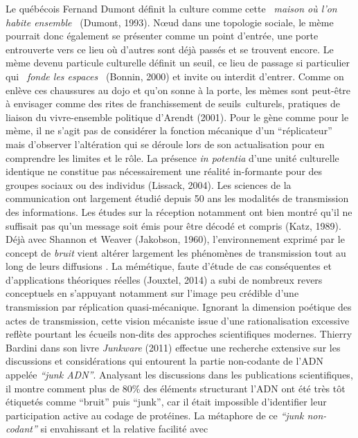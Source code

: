 Le qu\'eb\'ecois Fernand Dumont d\'efinit la culture comme cette \textit{{\guillemotleft}~maison o\`u l{\textquoteright}on habite ensemble~{\guillemotright} }(Dumont, 1993). N{\oe}ud dans une topologie sociale, le m\`eme pourrait donc \'egalement se pr\'esenter comme un point d{\textquoteright}entr\'ee, une porte entrouverte vers ce lieu o\`u d{\textquoteright}autres sont d\'ej\`a pass\'es et se trouvent encore. Le m\`eme devenu particule culturelle d\'efinit un seuil, ce lieu de passage si particulier qui \textit{{\guillemotleft}~fonde les espaces~{\guillemotright}} (Bonnin, 2000) et invite ou interdit d{\textquoteright}entrer. Comme on enl\`eve ces chaussures au dojo et qu{\textquoteright}on sonne \`a la porte, les m\`emes sont peut-\^etre \`a envisager comme des rites de franchissement de seuils~culturels, pratiques de liaison du vivre-ensemble politique d{\textquoteright}Arendt (2001). Pour le g\`ene comme pour le m\`eme, il ne s{\textquoteright}agit pas de consid\'erer la fonction m\'ecanique d{\textquoteright}un {\textquotedblleft}r\'eplicateur{\textquotedblright} mais d{\textquoteright}observer l{\textquoteright}alt\'eration qui se d\'eroule lors de son actualisation pour en comprendre les limites et le r\^ole. La pr\'esence \textit{in potentia }d{\textquoteright}une unit\'e culturelle identique ne constitue pas n\'ecessairement une r\'ealit\'e in-formante pour des groupes sociaux ou des individus (Lissack, 2004). Les sciences de la communication ont largement \'etudi\'e depuis 50 ans les modalit\'es de transmission des informations. Les \'etudes sur la r\'eception notamment ont bien montr\'e qu{\textquoteright}il ne suffisait pas qu{\textquoteright}un message soit \'emis pour \^etre d\'ecod\'e et compris (Katz, 1989). D\'ej\`a avec Shannon et Weaver (Jakobson, 1960), l{\textquoteright}environnement exprim\'e par le concept de\textit{ bruit }vient alt\'erer largement les ph\'enom\`enes de transmission tout au long de leurs diffusions \cite{Chandler2008}. La m\'em\'etique, faute d{\textquoteright}\'etude de cas cons\'equentes et d{\textquoteright}applications th\'eoriques r\'eelles (Jouxtel, 2014) a subi de nombreux revers conceptuels en s{\textquoteright}appuyant notamment sur l{\textquoteright}image peu cr\'edible d{\textquoteright}une transmission par r\'eplication quasi-m\'ecanique. Ignorant la dimension po\'etique des actes de transmission, cette vision m\'ecaniste issue d{\textquoteright}une rationalisation excessive refl\`ete pourtant les \'ecueils non-dits des approches scientifiques modernes. Thierry Bardini dans son livre \textit{Junkware }(2011) effectue une recherche extensive sur les discussions et consid\'erations qui entourent la partie non-codante de l{\textquoteright}ADN appel\'ee \textit{{\textquotedblleft}junk ADN{\textquotedblright}}. Analysant les discussions dans les publications scientifiques, il montre comment plus de 80\% des \'el\'ements structurant l{\textquoteright}ADN ont \'et\'e tr\`es t\^ot \'etiquet\'es comme {\textquotedblleft}bruit{\textquotedblright} puis {\textquotedblleft}junk{\textquotedblright}, car il \'etait impossible d{\textquoteright}identifier leur participation active au codage de prot\'eines. La m\'etaphore de ce \textit{{\textquotedblleft}junk non-codant{\textquotedblright} }si envahissant et la relative facilit\'e avec 